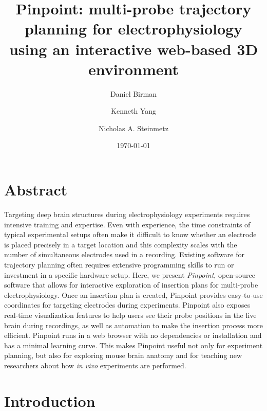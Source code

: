 \documentclass{article}
\title{Pinpoint: multi-probe trajectory planning for electrophysiology using an interactive web-based 3D environment}
\author[1,3,*]{Daniel Birman}
\author[1]{Kenneth Yang}
\author[1,3]{Nicholas A. Steinmetz}
\affil[1]{Department of Biological Structure, University of Washington, Seattle, WA 98195, USA}
\affil[3]{International Brain Laboratory, ?, ?, ?}
\affil[*]{Corresponding author: dbirman@uw.edu}
\date{\today}
\begin{document}

\maketitle

\section{Abstract}
Targeting deep brain structures during electrophysiology experiments requires intensive training and expertise. Even with experience, the time constraints of typical experimental setups often make it difficult to know whether an electrode is placed precisely in a target location and this complexity scales with the number of simultaneous electrodes used in a recording. Existing software for trajectory planning often requires extensive programming skills to run or investment in a specific hardware setup. Here, we present \textit{Pinpoint}, open-source software that allows for interactive exploration of insertion plans for multi-probe electrophysiology. Once an insertion plan is created, Pinpoint provides easy-to-use coordinates for targeting electrodes during experiments. Pinpoint also exposes real-time visualization features to help users see their probe positions in the live brain during recordings, as well as automation to make the insertion process more efficient. Pinpoint runs in a web browser with no dependencies or installation and has a minimal learning curve. This makes Pinpoint useful not only for experiment planning, but also for exploring mouse brain anatomy and for teaching new researchers about how \textit{in vivo} experiments are performed. 

\clearpage

\linenumbers

\section{Introduction}

\end{document}
